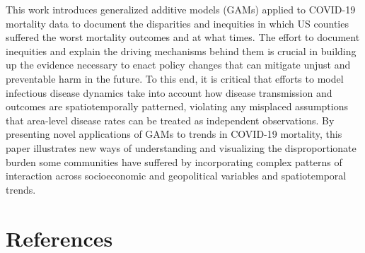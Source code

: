\documentclass[
]{article}
\begin{document}
This work introduces generalized additive models (GAMs) applied to COVID-19
mortality data to document the disparities and inequities in which US counties
suffered the worst mortality outcomes and at what times. The effort to document
inequities and explain the driving mechanisms behind them is crucial in building
up the evidence necessary to enact policy changes that can mitigate unjust and
preventable harm in the future. To this end, it is critical that efforts to
model infectious disease dynamics take into account how disease transmission and
outcomes are spatiotemporally patterned, violating any misplaced assumptions
that area-level disease rates can be treated as independent observations. By
presenting novel applications of GAMs to trends in COVID-19 mortality, this
paper illustrates new ways of understanding and visualizing the disproportionate
burden some communities have suffered by incorporating complex patterns of
interaction across socioeconomic and geopolitical variables and spatiotemporal
trends.

\newpage

\hypertarget{references}{%
\section*{References}\label{references}}
\end{document}
